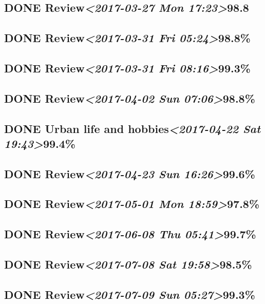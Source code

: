 \documentclass[11pt]{ctexart}
\begin{document}
\subsection{{\bfseries\sffamily DONE} Review\textit{<2017-03-27 Mon 17:23>}98.8}
\label{sec:org081b719}
\subsection{{\bfseries\sffamily DONE} Review\textit{<2017-03-31 Fri 05:24>}98.8\%}
\label{sec:orgc55aa9d}
\subsection{{\bfseries\sffamily DONE} Review\textit{<2017-03-31 Fri 08:16>}99.3\%}
\label{sec:orgc09ada9}
\subsection{{\bfseries\sffamily DONE} Review\textit{<2017-04-02 Sun 07:06>}98.8\%}
\label{sec:org6b63283}
\subsection{{\bfseries\sffamily DONE} Urban life and hobbies\textit{<2017-04-22 Sat 19:43>}99.4\%}
\label{sec:org6d89d6c}
\subsection{{\bfseries\sffamily DONE} Review\textit{<2017-04-23 Sun 16:26>}99.6\%}
\label{sec:org0e41124}
\subsection{{\bfseries\sffamily DONE} Review\textit{<2017-05-01 Mon 18:59>}97.8\%}
\label{sec:org5da7255}
\subsection{{\bfseries\sffamily DONE} Review\textit{<2017-06-08 Thu 05:41>}99.7\%}
\label{sec:orgc134bad}
\subsection{{\bfseries\sffamily DONE} Review\textit{<2017-07-08 Sat 19:58>}98.5\%}
\label{sec:org9a03380}
\subsection{{\bfseries\sffamily DONE} Review\textit{<2017-07-09 Sun 05:27>}99.3\%}
\label{sec:orgc830e25}
\end{document}
